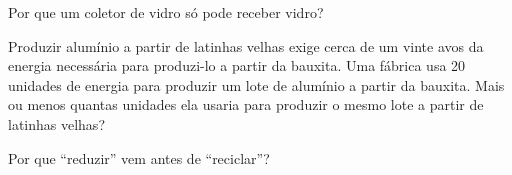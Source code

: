 \begin{exercise}[$\star$]\label{exo:g5:raw-materials-and-recycling:9}
Por que um coletor de vidro só pode receber vidro?
\end{exercise}

\begin{exercise}[$\star\star$]\label{exo:g5:raw-materials-and-recycling:10}
Produzir alumínio a partir de latinhas velhas exige cerca de um vinte
avos da energia necessária para produzi-lo a partir da bauxita. Uma
fábrica usa 20 unidades de energia para produzir um lote de alumínio a
partir da bauxita. Mais ou menos quantas unidades ela usaria para
produzir o mesmo lote a partir de latinhas velhas?
\end{exercise}

\begin{exercise}[$\star\star$]\label{exo:g5:raw-materials-and-recycling:11}
Por que ``reduzir'' vem antes de ``reciclar''?
\end{exercise}
